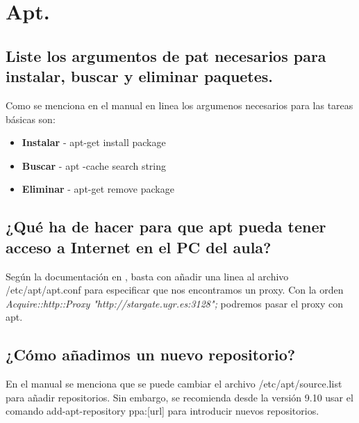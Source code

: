 
\section{Apt.}


\subsection{Liste los argumentos de pat necesarios para instalar, buscar y eliminar paquetes.}

Como se menciona en el manual en linea\cite{manapt} los argumenos necesarios para las tareas básicas son:
\begin{itemize}
	\item \textbf{Instalar} - apt-get install package
	\item \textbf{Buscar} - apt	-cache search string
	\item \textbf{Eliminar} - apt-get remove package
\end{itemize}

\vspace{6mm}

\subsection{¿Qué ha de hacer para que apt pueda tener acceso a Internet en el PC del aula?}

Según la documentación en \cite{proxyapt}, basta con añadir una linea al archivo /etc/apt/apt.conf para especificar que nos encontramos un proxy.
Con la orden \textit{Acquire::http::Proxy "http://stargate.ugr.es:3128";} podremos pasar el proxy con apt.
\vspace{6mm}

\subsection{¿Cómo añadimos un nuevo repositorio?}

En el manual\cite{repoapt} se menciona que se puede cambiar el archivo /etc/apt/source.list para añadir repositorios. Sin embargo,
se recomienda desde la versión 9.10 usar el comando add-apt-repository ppa:[url] para introducir nuevos repositorios.


